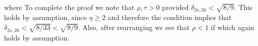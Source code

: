 \documentclass[10.5pt]{article}
\newcommand{\annote}[1]{{\leavevmode\color{RoyalBlue}{#1}}}
\begin{document}
{{}
where
To complete the proof we note that $\rho, \tau > 0$ provided $\delta_{2s,2k} < \sqrt{8/9}$.  This holds by assumption, since $\eta \geq 2$ and therefore the condition  implies that $\delta_{2s,2k} < \sqrt{8/33} < \sqrt{8/9}$.  Also, after rearranging we see that $\rho < 1$ if
which again holds by assumption.
}

%  
\end{document}
